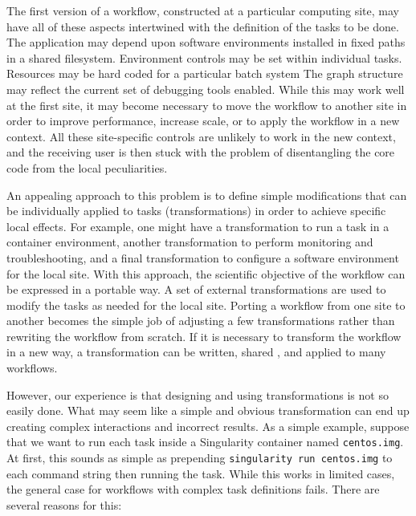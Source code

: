 \documentclass[conference]{IEEEtran}
\begin{document}
The first version of a workflow, constructed at a particular computing site,
may have all of these aspects intertwined with the definition of the
tasks to be done.  
The application may depend upon
software environments installed in fixed paths in a shared filesystem.
Environment controls may be set within individual tasks.
Resources may be
hard coded for a particular batch system
The graph structure may reflect
the current set of debugging tools enabled.  
While this may work well at the
first site, it may become necessary to move the workflow to another
site in order to improve performance, increase scale, or to apply the workflow in a new context.
All these site-specific controls are unlikely to work in the new context,
and the receiving user is then stuck with the problem of disentangling the
core code from the local peculiarities.

An appealing approach to this problem is to define 
simple modifications that can be individually applied to tasks
(transformations) in order
to achieve specific local effects.  For example, one might have a transformation
to run a task in a container environment, another transformation to perform monitoring
and troubleshooting, and a final transformation to configure a software environment
for the local site.  With this approach, the scientific objective of the workflow
can be expressed in a portable way. 
A set of external transformations are used to
modify the tasks as needed for the local site.  Porting a workflow from one site
to another becomes the simple job of adjusting a few transformations rather than
rewriting the workflow from scratch.  
If it is necessary to transform
the workflow in a new way, 
a transformation can be written, shared
, and applied to many workflows.

However, our experience is that designing and using transformations
is not so easily done. What may seem like a simple and obvious
transformation can end up creating complex interactions and
incorrect results.  As a simple example, suppose that
we want to run each task inside a Singularity
container named {\tt centos.img}.
At first, this sounds
as simple as prepending {\tt singularity run centos.img} to each
command string then running the task.  While this 
works in limited cases, the general case for workflows
with complex task definitions fails.  There are several reasons for this:
\end{document}
